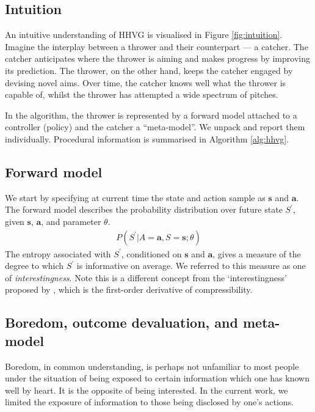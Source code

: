 \documentclass[utf8]{frontiersSCNS}
\newcommand{\bs}{\boldsymbol}
\begin{document}
\subsection{Intuition} \label{subsec:intuition}

An intuitive understanding of HHVG is visualised in Figure \ref{fig:intuition}. Imagine the interplay between a thrower and their counterpart --- a catcher. The catcher anticipates where the thrower is aiming and makes progress by improving its prediction. The thrower, on the other hand, keeps the catcher engaged by devising novel aims. Over time, the catcher knows well what the thrower is capable of, whilst the thrower has attempted a wide spectrum of pitches.

In the algorithm, the thrower is represented by a forward model attached to a controller (policy) and the catcher a ``meta-model''. We unpack and report them individually. Procedural information is summarised in Algorithm \ref{alg:hhvg}.

\subsection{Forward model} \label{subsec:fm}

We start by specifying at current time the state and action sample as $\bs{s}$ and $\bs{a}$. The forward model describes the probability distribution over future state $S^\prime$, given $\bs{s}$, $\bs{a}$, and parameter $\theta$.
%
	\begin{equation}
	\begin{aligned} \label{eq:fm}
	P(S^\prime | A=\bs{a}, S=\bs{s}; \theta)
	\end{aligned}
	\end{equation}
%
The entropy associated with $S^\prime$, conditioned on $\bs{s}$ and $\bs{a}$, gives a measure of the degree to which $S^\prime$ is informative on average. We referred to this measure as one of {\it interestingness}. Note this is a different concept from the `interestingness' proposed by \citet{schmidhuber2008driven}, which is the first-order derivative of compressibility.

\subsection{Boredom, outcome devaluation, and meta-model} \label{subsec:boredom}

Boredom, in common understanding, is perhaps not unfamiliar to most people under the situation of being exposed to certain information which one has known well by heart. It is the opposite of being interested. In the current work, we limited the exposure of information to those being disclosed by one's actions.
\end{document}
